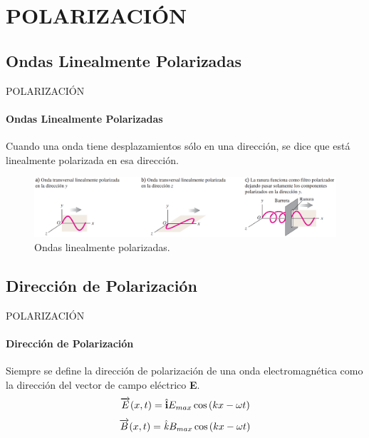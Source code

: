 \section{POLARIZACIÓN}
\subsection{Ondas Linealmente Polarizadas}

\begin{frame}{POLARIZACIÓN}
    \framesubtitle{Ondas Linealmente Polarizadas}
    Cuando una onda tiene desplazamientos sólo en una dirección, se dice que está linealmente polarizada en esa dirección.
    \begin{figure}
        \centering
        \includegraphics[scale=0.1815]{mari/m_linealpolari.PNG}
        \caption{Ondas linealmente polarizadas\footnotemark{}.}
    \end{figure}
\end{frame}
\subsection{Dirección de Polarización}
\begin{frame}{POLARIZACIÓN}
    \framesubtitle{Dirección de Polarización}
    Siempre se define la dirección de polarización de una onda electromagnética como la dirección del vector de campo eléctrico \textbf{E}.
    \begin{equation}
        \overrightarrow{E}(x,t)=\hat{\mathbf{i}} E_{max}\cos\left({kx-\omega t}\right)
    \end{equation}
    \begin{equation}
        \overrightarrow{B}(x,t)=\hat{\mathit{k}} B_{max}\cos\left({kx-\omega t}\right)
    \end{equation}
\end{frame}
